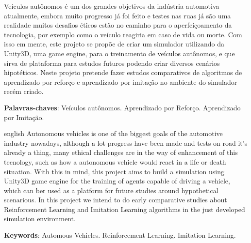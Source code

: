 
\setlength{\absparsep}{18pt} %
\begin{resumo}
Veículos autônomos é um dos grandes objetivos da indústria automotiva atualmente, embora muito progresso já foi feito e testes nas ruas já são uma realidade muitos desafios éticos estão no caminho para o aperfeiçoamento da tecnologia, por exemplo como o veículo reagiria em caso de vida ou morte. Com isso em mente, este projeto se propõe de criar um simulador utilizando da Unity3D, uma game engine, para o treinamento de veículos autônomos, e que sirva de plataforma para estudos futuros podendo criar diversos cenários hipotéticos. Neste projeto pretende fazer estudos comparativos de algoritmos de aprendizado por reforço e aprendizado por imitação no ambiente do simulador recém criado.

 \textbf{Palavras-chaves}: Veículos autônomos. Aprendizado por Reforço. Aprendizado por Imitação.
\end{resumo}

\begin{resumo}[Abstract]
 \begin{otherlanguage*}{english}
   Autonomous vehicles is one of the biggest goals of the automotive industry nowadays, although a lot progress have been made and tests on road it's already a thing, many ethical challenges are in the way of enhancement of this tecnology, such as how a autonomous vehicle would react in a life or death situation. With this in mind, this project aims to build a simulation using Unity3D game engine for the training of agents capable of driving a vehicle, which can ber used as a platform for future studies around hypothetical scenarious. In this project we intend to do early comparative studies about Reinforcement Learning and Imitation Learning algorithms in the just developed simulation environment.

   \vspace{\onelineskip}
 
   \noindent 
   \textbf{Keywords}: Automous Vehicles. Reinforcement Learning. Imitation Learning.
 \end{otherlanguage*}
\end{resumo}